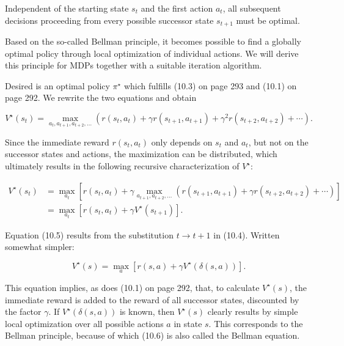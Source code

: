 \documentclass[10pt]{book}
\begin{document}
Independent of the starting state $s_{t}$ and the first action $a_{t}$, all subsequent decisions proceeding from every possible successor state $s_{t+1}$ must be optimal.

Based on the so-called Bellman principle, it becomes possible to find a globally optimal policy through local optimization of individual actions. We will derive this principle for MDPs together with a suitable iteration algorithm.

Desired is an optimal policy $\pi^{\star}$ which fulfills (10.3) on page 293 and (10.1) on page 292. We rewrite the two equations and obtain

\begin{equation*}
V^{\star}\left(s_{t}\right)=\max _{a_{t}, a_{t+1}, a_{t+2}, \ldots}\left(r\left(s_{t}, a_{t}\right)+\gamma r\left(s_{t+1}, a_{t+1}\right)+\gamma^{2} r\left(s_{t+2}, a_{t+2}\right)+\cdots\right) . \tag{10.4}
\end{equation*}

Since the immediate reward $r\left(s_{t}, a_{t}\right)$ only depends on $s_{t}$ and $a_{t}$, but not on the successor states and actions, the maximization can be distributed, which ultimately results in the following recursive characterization of $V^{\star}$:

\begin{align*}
V^{\star}\left(s_{t}\right) & =\max _{a_{t}}\left[r\left(s_{t}, a_{t}\right)+\gamma \max _{a_{t+1}, a_{t+2}, \ldots}\left(r\left(s_{t+1}, a_{t+1}\right)+\gamma r\left(s_{t+2}, a_{t+2}\right)+\cdots\right)\right] \\
& =\max _{a_{t}}\left[r\left(s_{t}, a_{t}\right)+\gamma V^{\star}\left(s_{t+1}\right)\right] . \tag{10.5}
\end{align*}

Equation (10.5) results from the substitution $t \rightarrow t+1$ in (10.4). Written somewhat simpler:

\begin{equation*}
V^{\star}(s)=\max _{a}\left[r(s, a)+\gamma V^{\star}(\delta(s, a))\right] . \tag{10.6}
\end{equation*}

This equation implies, as does (10.1) on page 292, that, to calculate $V^{\star}(s)$, the immediate reward is added to the reward of all successor states, discounted by the factor $\gamma$. If $V^{\star}(\delta(s, a))$ is known, then $V^{\star}(s)$ clearly results by simple local optimization over all possible actions $a$ in state $s$. This corresponds to the Bellman principle, because of which (10.6) is also called the Bellman equation.
\end{document}
